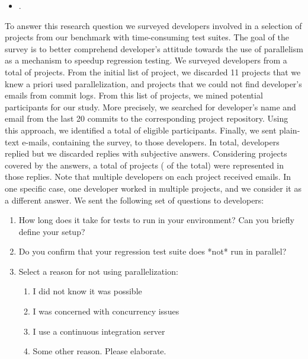 \documentclass[10pt,journal,compsoc]{IEEEtran}
\begin{document}
\begin{itemize}
  \item \numRQAdoptionTwo{}. \textbf{\RQAdoptionTwo{}}
\end{itemize}

To answer this research question we surveyed developers involved in a
selection of projects from our benchmark with time-consuming test
suites.  The goal of the survey is to better comprehend developer's
attitude towards the use of parallelism as a mechanism to speedup
regression testing.  We surveyed developers from a total of
\emailsProjects{} projects.  From the initial list of \numMedLong{}
project, we discarded 11 projects that we knew a priori used
parallelization, and \discartedProjects{} projects that we could not find
developer's emails from commit logs.  From this list of projects, we
mined potential participants for our study.  More precisely, we
searched for developer's name and email from the last 20 commits to
the corresponding project repository.  Using this approach, we
identified a total of \emailsSent{} eligible participants.  Finally,
we sent plain-text e-mails, containing the survey, to those developers.  In
total, \emailsAnswered{} developers replied but we discarded
\emailsFalseAnswers{} replies with subjective answers.  Considering
projects covered by the answers, a total of \emailsProjectsAnswered{}
projects (\percEmailsProjectsAnswered{} of the total) were represented
in those replies. Note that multiple developers on each project
received emails. In one specific case, one developer worked in
  multiple projects, and we consider it as a different answer. We sent the following set of questions to
developers:

\begin{enumerate}
\item How long does it take for tests to run in your environment? Can
  you briefly define your setup?
\item Do you confirm that your regression test suite does *not* run in parallel?
\item\label{questionThree} Select a reason for not using parallelization:
  \begin{enumerate}[label=\alph*)]
  \item I did not know it was possible
  \item I was concerned with concurrency issues
  \item I use a continuous integration server
  \item Some other reason. Please elaborate.
  \end{enumerate}
\end{enumerate}
\end{document}
